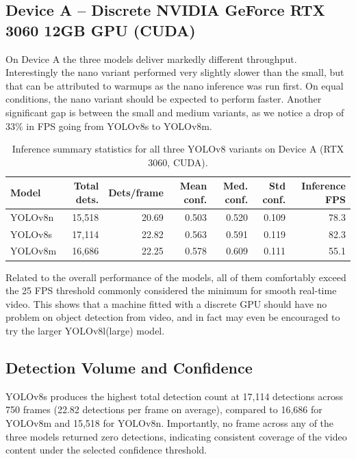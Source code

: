 \subsection{Device A – Discrete NVIDIA GeForce RTX 3060 12GB GPU (CUDA)}
On Device A the three models deliver markedly different throughput. Interestingly the nano variant performed very slightly slower than the small, but that can be attributed to warmups as the nano inference was run first. On equal conditions, the nano variant should be expected to perform faster. Another significant gap is between the small and medium variants, as we notice a drop of 33\% in FPS going from YOLOv8s to YOLOv8m. 

\begin{table}[H]
\centering
\small
\label{tab:inference_rtx3060_summary}
\begin{tabular}{lrrrrrr}
\toprule
\textbf{Model} & \textbf{Total dets.} & \textbf{Dets/frame} & \textbf{Mean conf.} & \textbf{Med. conf.} & \textbf{Std conf.} & \textbf{Inference FPS} \\
\midrule
YOLOv8n & 15{,}518 & 20.69 & 0.503 & 0.520 & 0.109 & 78.3 \\
YOLOv8s & 17{,}114 & 22.82 & 0.563 & 0.591 & 0.119 & 82.3 \\
YOLOv8m & 16{,}686 & 22.25 & 0.578 & 0.609 & 0.111 & 55.1 \\
\bottomrule
\end{tabular}
\caption{Inference summary statistics for all three YOLOv8 variants on Device A (RTX 3060, CUDA).}
\end{table}

Related to the overall performance of the models, all of them comfortably exceed the 25 FPS threshold commonly considered the minimum for smooth real-time video. This shows that a machine fitted with a discrete GPU should have no problem on object detection from video, and in fact may even be encouraged to try the larger YOLOv8l(large) model.

\subsection{Detection Volume and Confidence}
YOLOv8s produces the highest total detection count at 17,114 detections across 750 frames (22.82 detections per frame on average), compared to 16,686 for YOLOv8m and 15,518 for YOLOv8n. Importantly, no frame across any of the three models returned zero detections, indicating consistent coverage of the video content under the selected confidence threshold.

